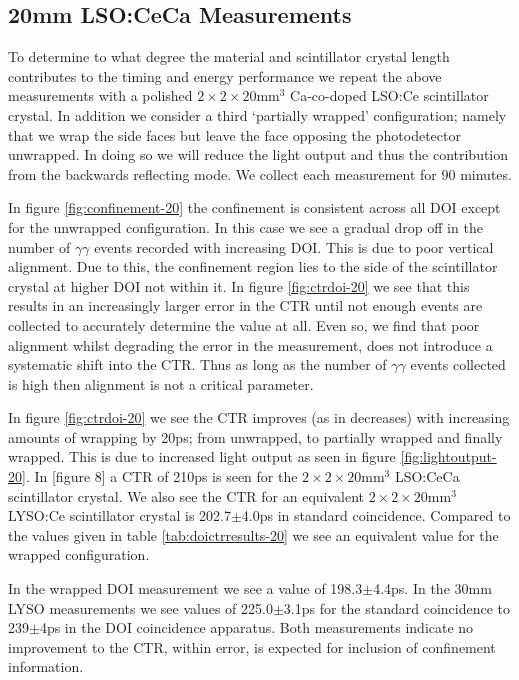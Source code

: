\subsection{20mm LSO:CeCa Measurements}
To determine to what degree the material and scintillator crystal length contributes to the timing and energy performance we repeat the above measurements with a polished $2\times2\times20$mm$^3$ Ca-co-doped LSO:Ce scintillator crystal. In addition we consider a third `partially wrapped' configuration; namely that we wrap the side faces but leave the face opposing the photodetector unwrapped. In doing so we will reduce the light output and thus the contribution from the backwards reflecting mode. We collect each measurement for 90 minutes.

In figure \ref{fig:confinement-20} the confinement is consistent across all DOI except for the unwrapped configuration. In this case we see a gradual drop off in the number of $\gamma\gamma$ events recorded with increasing DOI. This is due to poor vertical alignment. Due to this, the confinement region lies to the side of the scintillator crystal at higher DOI not within it. In figure \ref{fig:ctrdoi-20} we see that this results in an increasingly larger error in the CTR until not enough events are collected to accurately determine the value at all. Even so, we find that poor alignment whilst degrading the error in the measurement, does not introduce a systematic shift into the CTR. Thus as long as the number of $\gamma\gamma$ events collected is high then alignment is not a critical parameter. 

In figure \ref{fig:ctrdoi-20} we see the CTR improves (as in decreases) with increasing amounts of wrapping by 20ps; from unwrapped, to partially wrapped and finally wrapped. This is due to increased light output as seen in figure \ref{fig:lightoutput-20}. In [figure 8] \cite{r_Paganoni_Pauwels_et_al__2011} a CTR of 210ps is seen for the $2\times2\times20$mm$^3$ LSO:CeCa scintillator crystal. We also see the CTR for an equivalent $2\times2\times20$mm$^3$ LYSO:Ce scintillator crystal is 202.7$\pm$4.0ps in standard coincidence. Compared to the values given in table \ref{tab:doictrresults-20} we see an equivalent value for the wrapped configuration.

In the wrapped DOI measurement we see a value of 198.3$\pm$4.4ps. In the 30mm LYSO measurements we see values of 225.0$\pm$3.1ps for the standard coincidence to 239$\pm$4ps in the DOI coincidence apparatus. Both measurements indicate no improvement to the CTR, within error, is expected for inclusion of confinement information.

